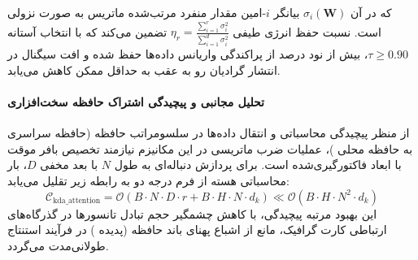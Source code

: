که در آن $\sigma_i(\mathbf{W})$ بیانگر $i$-امین مقدار منفرد مرتب‌شده ماتریس به صورت نزولی است. نسبت حفظ انرژی طیفی $\eta_r = \frac{\sum_{i=1}^r \sigma_i^2}{\sum_{i=1}^{d} \sigma_i^2}$ تضمین می‌کند که با انتخاب آستانه $\tau \ge 0.90$، بیش از نود درصد از پراکندگی واریانس داده‌ها حفظ شده و افت سیگنال در انتشار گرادیان رو به عقب به حداقل ممکن کاهش می‌یابد.

\paragraph{تحلیل مجانبی و پیچیدگی اشتراک حافظه سخت‌افزاری}
از منظر پیچیدگی محاسباتی و انتقال داده‌ها در سلسومراتب حافظه (حافظه سراسری  به حافظه محلی )، عملیات ضرب ماتریسی در این مکانیزم نیازمند تخصیص بافر موقت با ابعاد فاکتورگیری‌شده است. برای پردازش دنباله‌ای به طول $N$ با بعد مخفی $D$، بار محاسباتی هسته از فرم درجه دو به رابطه زیر تقلیل می‌یابد:
\begin{equation}
\label{eq:complexity_kda_attention}
\mathcal{C}_{\text{kda\_attention}} = \mathcal{O}\left( B \cdot N \cdot D \cdot r + B \cdot H \cdot N \cdot d_k \right) \ll \mathcal{O}\left( B \cdot H \cdot N^2 \cdot d_k \right)
\end{equation}
این بهبود مرتبه پیچیدگی، با کاهش چشمگیر حجم تبادل تانسورها در گذرگاه‌های ارتباطی کارت گرافیک، مانع از اشباع پهنای باند حافظه (پدیده ) در فرآیند استنتاج طولانی‌مدت می‌گردد.
